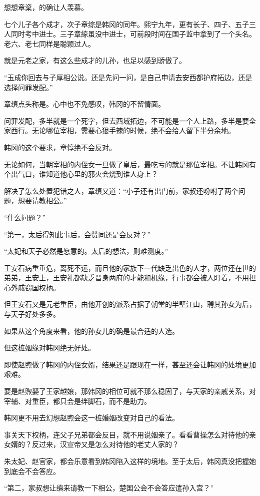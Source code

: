 想想章楶，的确让人羡慕。

七个儿子各个成才，次子章综是韩冈的同年。熙宁九年，更有长子、四子、五子三人同时考中进士。三子章綡虽没中进士，可前段时间在国子监中拿到了一个头名。老六、老七同样是聪颖过人。

就是元老之家，有这么些成才的儿孙，也足以感到骄傲了。

“玉成你回去与子厚相公说。还是先问一问，是自己申请去安西都护府拓边，还是选择问罪发配。”

章缜点头称是。心中也不免感叹，韩冈的不留情面。

问罪发配，多半就是一个死字，但去西域拓边，不可能是一个人上路，多半是要全家西行。无论哪位宰相，需要心狠手辣的时候，绝不会给人留下半分余地。

韩冈的这个要求，章惇绝不会反对。

无论如何，当朝宰相的内侄女一旦做了皇后，最吃亏的就是那位宰相。不让韩冈有个出气口，谁知道他心里的邪火会烧到谁人身上？

解决了怎么处置犯错之人，章缜又道：“小子还有出门前，家叔还吩咐了两个问题，想要请教相公。”

“什么问题？”

“第一，太后得知此事后，会赞同还是会反对？”

“太妃和天子必然是愿意的。太后的想法，则难测度。”

王安石病重垂危，离死不远，而且他的家族下一代缺乏出色的人才，两位还在世的弟弟，王安上，王安礼都缺乏晋身两府的才能和机缘，行事都会被人盯着，不用担心外戚窃国权柄。

但王安石又是元老重臣，由他开创的派系占据了朝堂的半壁江山，聘其孙女为后，与天子好处多多。

如果从这个角度来看，他的孙女儿的确是最合适的人选。

但这桩姻缘对韩冈绝无好处。

即使赵煦做了韩冈的内侄女婿，结果还是跟现在一样，甚至还会让韩冈的处境更加艰难。

要是赵煦娶了王家越娘，那韩冈的相位可就不那么稳固了，与天家的亲戚关系，对宰辅、对重臣，都只会是绊脚石，而不是助力。

韩冈更不用去幻想赵煦会这一桩婚姻改变对自己的看法。

事关天下权柄，连父子兄弟都会反目，就不用说姻亲了。看看曹操怎么对待他的亲女婿的？反过来，汉宣帝又是怎么对待他的老丈人家的？

朱太妃、赵官家，都会乐意看到韩冈陷入这样的境地。至于太后，韩冈真没把握她到底会不会答应。

“第二，家叔想让缜来请教一下相公，楚国公会不会答应遣孙入宫？”

